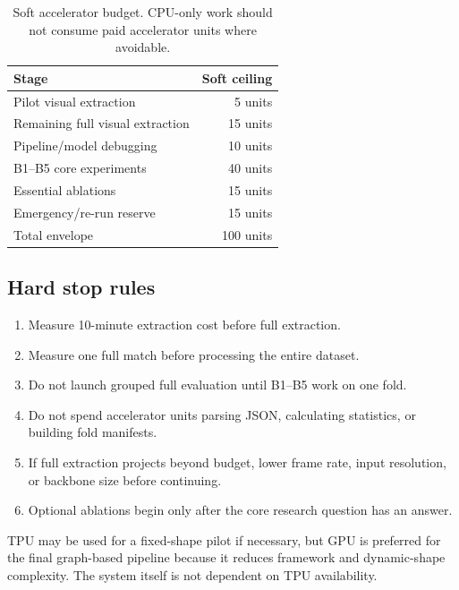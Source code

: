 \documentclass[11pt,a4paper]{article}
\begin{document}
\begin{table}[H]
\centering
\caption{Soft accelerator budget. CPU-only work should not consume paid accelerator units where avoidable.}
\begin{tabular}{lr}
\toprule
\textbf{Stage} & \textbf{Soft ceiling} \\
\midrule
Pilot visual extraction & 5 units \\
Remaining full visual extraction & 15 units \\
Pipeline/model debugging & 10 units \\
B1--B5 core experiments & 40 units \\
Essential ablations & 15 units \\
Emergency/re-run reserve & 15 units \\
\midrule
Total envelope & 100 units \\
\bottomrule
\end{tabular}
\end{table}

\subsection{Hard stop rules}
\begin{enumerate}
  \item Measure 10-minute extraction cost before full extraction.
  \item Measure one full match before processing the entire dataset.
  \item Do not launch grouped full evaluation until B1--B5 work on one fold.
  \item Do not spend accelerator units parsing JSON, calculating statistics, or building fold manifests.
  \item If full extraction projects beyond budget, lower frame rate, input resolution, or backbone size before continuing.
  \item Optional ablations begin only after the core research question has an answer.
\end{enumerate}

TPU may be used for a fixed-shape pilot if necessary, but GPU is preferred for the final graph-based pipeline because it reduces framework and dynamic-shape complexity. The system itself is not dependent on TPU availability.
\end{document}
